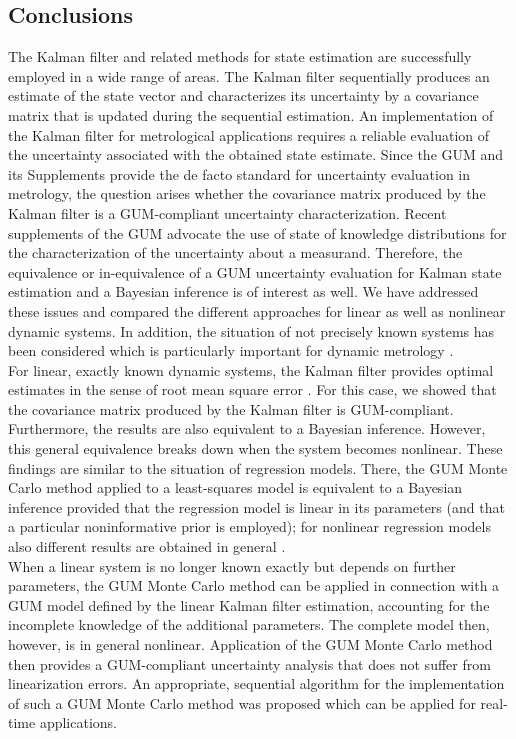 \documentclass[10pt]{article}
\begin{document}
\begin{spacing}{1}
\section{Conclusions}
\label{sec:conclusions}
The Kalman filter and related methods for state estimation are successfully employed in a wide range of areas. The Kalman filter sequentially produces an estimate of the state vector and characterizes its uncertainty by a covariance matrix that is updated during the sequential estimation.
An implementation of the Kalman filter for metrological applications requires a reliable evaluation of the uncertainty associated with the obtained state estimate. Since the GUM \cite{GUM} and its Supplements provide the de facto standard for uncertainty evaluation in metrology, the question arises whether the covariance matrix produced by the Kalman filter is a GUM-compliant uncertainty characterization. 
Recent supplements of the GUM \cite{GUMS1, GUMS2} advocate the use of state of knowledge distributions for the characterization of the uncertainty about a measurand. Therefore, the equivalence or in-equivalence of a GUM uncertainty evaluation for Kalman state estimation and a Bayesian inference is of interest as well. We have addressed these issues and compared the different approaches for linear as well as nonlinear dynamic systems. In addition, the situation of not precisely known systems has been considered which is particularly important for dynamic metrology \cite{Eichstadt2012Diss}.\\


For linear, exactly known dynamic systems, the Kalman filter provides optimal estimates in the sense of root mean square error \cite{Kalman}. For this case, we showed that the covariance matrix produced by the Kalman filter is GUM-compliant. Furthermore, the results are also equivalent to a Bayesian inference. However,
this general equivalence breaks down when the system becomes nonlinear. These findings are similar to the situation of regression models. There, the GUM Monte Carlo method applied to a least-squares model is equivalent to a Bayesian inference provided that the regression model is linear in its parameters (and that a particular noninformative prior is employed); for nonlinear regression models also different results are obtained in general \cite{Elster:2011jo}.\\

When a linear system is no longer known exactly but depends on further parameters, the GUM Monte Carlo method can be applied in connection with a GUM model defined by the linear Kalman filter estimation, accounting for the incomplete knowledge of the additional parameters. The complete model then, however, is in general nonlinear. Application of the GUM Monte Carlo method then provides a GUM-compliant uncertainty analysis that does not suffer from linearization errors. An appropriate, sequential algorithm for the implementation of such a GUM Monte Carlo method was proposed which can be applied for real-time applications.\\


\end{spacing}
\end{document}
